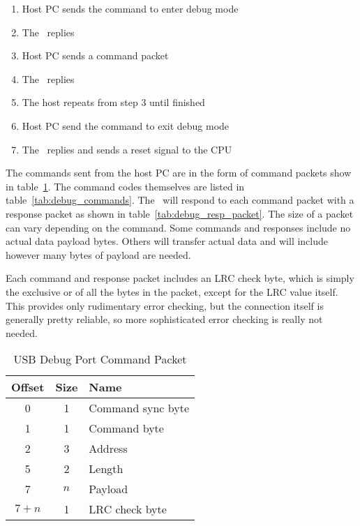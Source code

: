 \begin{enumerate}
    \item Host PC sends the command to enter debug mode
    \item The \jr\ replies
    \item Host PC sends a command packet
    \item The \jr\ replies
    \item The host repeats from step 3 until finished
    \item Host PC send the command to exit debug mode
    \item The \jr\ replies and sends a reset signal to the CPU
\end{enumerate}

The commands sent from the host PC are in the form of command packets show in table~\ref{tab:debug_cmd_packet}. The command codes themselves are listed in table~\ref{tab:debug_commands}. The \jr\ will respond to each command packet with a response packet as shown in table~\ref{tab:debug_resp_packet}. The size of a packet can vary depending on the command. Some commands and responses include no actual data payload bytes. Others will transfer actual data and will include however many bytes of payload are needed.

Each command and response packet includes an LRC check byte, which is simply the exclusive or of all the bytes in the packet, except for the LRC value itself. This provides only rudimentary error checking, but the connection itself is generally pretty reliable, so more sophisticated error checking is really not needed.

\begin{table}[ht]
    \begin{center}
        \begin{tabular}{|c|c|l|} \hline
            Offset & Size & Name \\ \hline\hline
            0 & 1 & Command sync byte\\ \hline
            1 & 1 & Command byte \\ \hline
            2 & 3 & Address \\ \hline
            5 & 2 & Length \\ \hline
            7 & $n$ & Payload \\ \hline
            $7 + n$ & 1 & LRC check byte\\ \hline
        \end{tabular}
    \end{center}
    \caption{USB Debug Port Command Packet}
    \label{tab:debug_cmd_packet}
\end{table}

